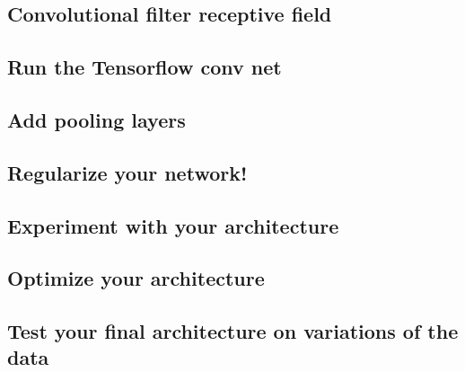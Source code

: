 \documentclass{article}
\begin{document}
\subsection{Convolutional filter receptive field}

\subsection{Run the Tensorflow conv net}

\subsection{Add pooling layers}

\subsection{Regularize your network!}

\subsection{Experiment with your architecture}

\subsection{Optimize your architecture}

\subsection{Test your final architecture on variations of the data}
\end{document}
